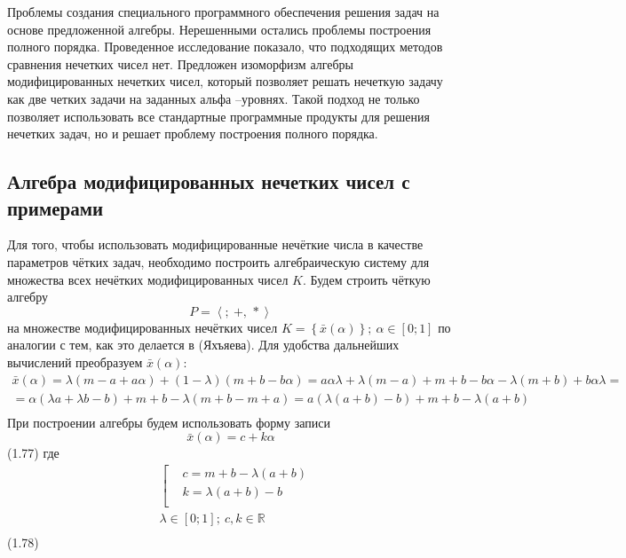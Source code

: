 Проблемы создания специального программного обеспечения решения задач на основе предложенной алгебры. Нерешенными остались проблемы построения полного порядка. Проведенное исследование показало, что подходящих методов сравнения нечетких чисел нет.
Предложен изоморфизм алгебры модифицированных нечетких чисел, который позволяет решать нечеткую задачу как две четких задачи на заданных альфа –уровнях.
Такой подход не только позволяет использовать все стандартные программные продукты для решения нечетких задач, но и решает проблему построения полного порядка.


\subsection{Алгебра модифицированных нечетких чисел с примерами}
Для того, чтобы использовать модифицированные нечёткие числа в качестве параметров чётких задач, необходимо построить алгебраическую систему для множества всех нечётких модифицированных чисел $K$. 
Будем строить чёткую алгебру \[P=\left\langle ;\ +,\,* \right\rangle \] на множестве модифицированных нечётких чисел $K=\left\{ \bar{x}\left( \alpha  \right) \right\};\ \alpha \in \left[ 0;1 \right]$ по аналогии с тем, как это делается в (Яхъяева). Для удобства дальнейших вычислений преобразуем $\bar{x}\left( \alpha  \right)$:
	\[\begin{matrix}
  \bar{x}\left( \alpha  \right)=\lambda \left( m-a+a\alpha  \right)+\left( 1-\lambda  \right)\left( m+b-b\alpha  \right)=a\alpha \lambda +\lambda \left( m-a \right)+m+b-b\alpha -\lambda \left( m+b \right)+b\alpha \lambda = \\ 
  =\alpha \left( \lambda a+\lambda b-b \right)+m+b-\lambda \left( m+b-m+a \right)=a\left( \lambda \left( a+b \right)-b \right)+m+b-\lambda \left( a+b \right) \\ 
\end{matrix}\] 
При построении алгебры будем использовать форму записи
	\[\bar{x}\left( \alpha  \right)=c+k\alpha \] 	(1.77)
где
	\[\begin{aligned}
  & \left[ \begin{aligned}
  & c=m+b-\lambda \left( a+b \right) \\ 
 & k=\lambda \left( a+b \right)-b \\ 
\end{aligned} \right. \\ 
 & \lambda \in \left[ 0;1 \right];\ c,k\in \mathbb{R} \\ 
\end{aligned}\] 	(1.78)
